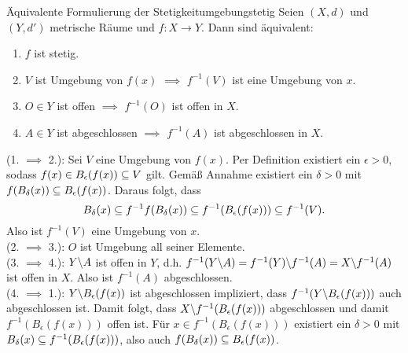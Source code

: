 \begin{satz}{Äquivalente Formulierung der Stetigkeit}{umgebungstetig}
Seien $(X,d)$ und $(Y,d')$ metrische Räume und $f: X \to Y$. Dann sind äquivalent:
\begin{enumerate}
\item $f$ ist stetig.
\item $V$ ist Umgebung von $f(x)$ $\implies$ $f^{-1}(V)$ ist eine Umgebung von $x$.
\item $O \in Y$ ist offen $\implies$ $f^{-1}(O)$ ist offen in $X$.
\item $A \in Y$ ist abgeschlossen $\implies$ $f^{-1}(A)$ ist abgeschlossen in $X$.
\end{enumerate}
\end{satz}
\begin{beweis}
(1. $\implies$ 2.): Sei $V$ eine Umgebung von $f(x)$. Per Definition existiert ein $\epsilon > 0$, sodass $f(x) \in B_\epsilon(f(x)) \subseteq V$ gilt. Gemäß Annahme existiert ein $\delta > 0$ mit $f(B_\delta(x))\subseteq B_\epsilon(f(x))$. Daraus folgt, dass 
\begin{equation}
B_\delta (x) \subseteq f^{-1}f(B_\delta(x)) \subseteq f^{-1}(B_\epsilon(f(x))) \subseteq f^{-1}(V).
\end{equation}
Also ist $f^{-1}(V)$ eine Umgebung von $x$.\\
(2. $\implies$ 3.): $O$ ist Umgebung all seiner Elemente.\\
(3. $\implies$ 4.): $Y \backslash A$ ist offen in $Y$, d.h. $f^{-1}(Y \backslash A) = f^{-1}(Y) \backslash f^{-1}(A) = X \backslash f^{-1}(A)$ ist offen in $X$. Also ist $f^{-1}(A)$ abgeschlossen.\\
(4. $\implies$ 1.): $Y \backslash B_\epsilon(f(x))$ ist abgeschlossen impliziert, dass $f^{-1} (Y \backslash B_\epsilon(f(x)))$ auch abgeschlossen ist. Damit folgt, dass $X \backslash f^{-1}(B_\epsilon(f(x)))$ abgeschlossen und damit $f^{-1}(B_\epsilon(f(x)))$ offen ist. Für $x \in f^{-1}(B_\epsilon(f(x)))$ existiert ein $\delta > 0$ mit $B_\delta(x) \subseteq f^{-1}(B_\epsilon(f(x)))$, also auch $f(B_\delta(x)) \subseteq B_\epsilon(f(x))$.
\end{beweis}

